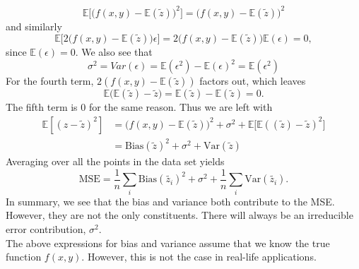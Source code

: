 \documentclass[notitlepage, reprint, nofootinbib]{revtex4-1}
\begin{document}
$$\mathbb{E}\Big[\big(f(x,y)-\mathbb{E}(\tilde{z})\big)^2\Big]=\big(f(x,y)-\mathbb{E}(\tilde{z})\big)^2$$
and similarly  
$$\mathbb{E}\Big[2\big(f(x,y)-\mathbb{E}(\tilde{z})\big)\epsilon\Big]=2\big(f(x,y)-\mathbb{E}(\tilde{z})\big)\mathbb{E}(\epsilon)=0,$$
since $\mathbb{E}(\epsilon)=0$. We also see that 
$$\sigma^2=Var(\epsilon)=\mathbb{E}(\epsilon^2)-\mathbb{E}(\epsilon)^2=\mathbb{E}(\epsilon^2)$$
For the fourth term, $2(f(x,y)-\mathbb{E}(\tilde{z}))$ factors out, which leaves 
$$\mathbb{E}\big(\mathbb{E}(\tilde{z})-\tilde{z}\big)=\mathbb{E}(\tilde{z})-\mathbb{E}(\tilde{z})=0.$$
The fifth term is 0 for the same reason. Thus we are left with
\begin{align}
	\mathbb{E}[(z-\tilde{z})^2]&=\big(f(x,y)-\mathbb{E}(\tilde{z})\big)^2+\sigma^2+\mathbb{E}\big[\mathbb{E}((\tilde{z})-\tilde{z})^2\big]\nonumber\\
	&=\text{Bias}(\tilde{z})^2+\sigma^2+\text{Var}(\tilde{z})
\end{align}
Averaging over all the points in the data set yields
\begin{equation}\text{MSE}=\frac{1}{n}\sum_i\text{Bias}(\tilde{z_i})^2+\sigma^2+\frac{1}{n}\sum_i\text{Var}(\tilde{z_i}).\end{equation}
In summary, we see that the bias and variance both contribute to the MSE. However, they are not the only constituents. There will always be an irreducible error contribution, $\sigma^2$. \\[2mm]
The above expressions for bias and variance assume that we know the true function $f(x,y)$. However, this is not the case in real-life applications. 
\newpage
\end{document}
